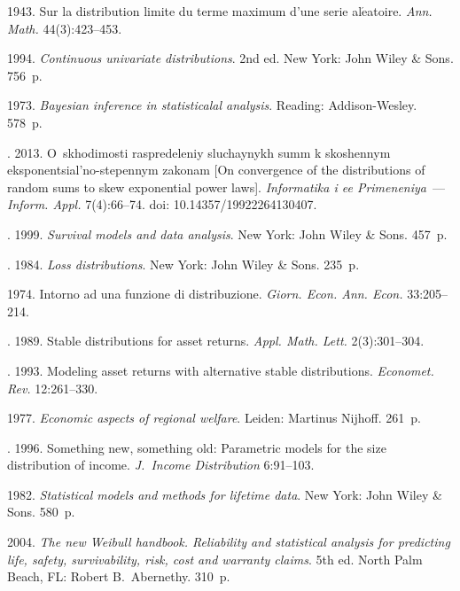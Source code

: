 \begin{multicols}{2}
{{\begin{thebibliography}{99}
 1943. Sur la distribution limite du terme maximum d'une
serie al$\acute{\mbox{e}}$atoire. \textit{Ann. Math.} 44(3):423--453.

1994. \textit{Continuous univariate distributions}. 2nd ed.
New York: John Wiley \& Sons. 756~p.

 1973. \textit{Bayesian inference in statisticalal analysis}.
Reading: Addison-Wesley. 578~p.

. 2013.
O~skhodimosti raspredeleniy sluchaynykh summ k skoshennym
eks\-po\-nen\-tsi\-al'no-ste\-pen\-nym zakonam
[On convergence of the distributions of random sums to skew exponential power laws].
\textit{Informatika i ee Primeneniya}~--- \textit{Inform. Appl.} 7(4):66--74.
doi: 10.14357/19922264130407.

. 1999.
\textit{Survival models and data analysis}. New York: John Wiley \& Sons. 457~p.

. 1984.
\textit{Loss distributions}. New York: John Wiley \& Sons. 235~p.

 1974. Intorno ad una funzione di distribuzione.
\textit{Giorn. Econ. Ann. Econ.} 33:205--214.

. 1989. Stable distributions
for asset returns. \textit{Appl. Math. Lett.} 2(3):301--304.

. 1993.
Modeling asset returns with alternative stable distributions.
\textit{Economet. Rev.} 12:261--330.

 1977. \textit{Economic aspects of regional welfare}.
Leiden: Martinus Nijhoff. 261~p.

. 1996.
Something new, something old: Parametric models for the size distribution of
income. \textit{J.~Income Distribution} 6:91--103.



 1982.
\textit{Statistical models and methods for lifetime data}.
New York: John Wiley \& Sons. 580~p.

 2004.
\textit{The new Weibull handbook. Reliability
and statistical analysis for predicting life, safety, survivability, risk, cost and
warranty claims}. 5th ed. North Palm Beach, FL: Robert B.~Abernethy. 310~p.


\end{thebibliography}}}
\end{multicols}
